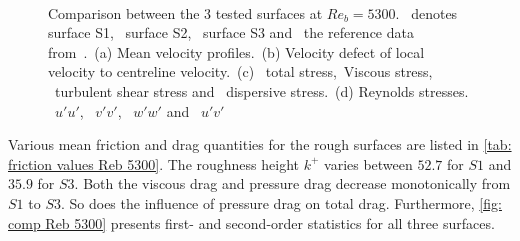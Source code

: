\begin{figure}
    \centering
    \begin{subfigure}[t]{0.495\textwidth}
        \centering
        \subcaption{}
        
        \label{subfig: Reb 5300 velocity profile}
    \end{subfigure}
    \hfill
    \begin{subfigure}[t]{0.495\textwidth}
        \centering
        \subcaption{}
        
        \label{subfig: Reb 5300 velocity defect}        
    \end{subfigure}
    \plotverticalspacing
    \begin{subfigure}[t]{0.495\textwidth}
        \centering
        \subcaption{}
        
        \label{subfig: Reb 5300 total stresses}
    \end{subfigure}
    \hfill
    \begin{subfigure}[t]{0.495\textwidth}
        \centering
        \subcaption{}
        
        \label{subfig: Reb 5300 reynolds stresses}
    \end{subfigure}
    \\[-10pt]
    \caption[Comparison of $S1$, $S2$ and $S3$ at $Re_b = 5300$]{Comparison between the 3 tested surfaces at $Re_b = 5300$. \sOneFiveThreeSymbol \ denotes surface S1, \sTwoFiveThreeSymbol \ surface S2, \sThreeFiveThreeSymbol \ surface S3 and  \ the reference data from~\cite{yaoDirectNumericalSimulations2023}.~(a) Mean velocity profiles.~(b) Velocity defect of local velocity to centreline velocity.~(c) \lsTotalStressSymbol \ total stress,\lsViscousStressSymbol \ Viscous stress, \lsReynoldsStressSymbol \ turbulent shear stress and \lsDispersiveStressSymbol \ dispersive stress.~(d) Reynolds stresses. \lsRuuSymbol \ $u'u'$, \lsRvvSymbol \ $v'v'$, \lsRwwSymbol \ $w'w'$ and \lsRuvSymbol \ $u'v'$}
    \label{fig: comp Reb 5300}
\end{figure}
Various mean friction and drag quantities for the rough surfaces are listed in \autoref{tab: friction values Reb 5300}.
The roughness height $k^+$ varies between $52.7$ for $S1$ and $35.9$ for $S3$.
Both the viscous drag and pressure drag decrease monotonically from $S1$ to $S3$.
So does the influence of pressure drag on total drag. 
Furthermore, \autoref{fig: comp Reb 5300} presents first- and second-order statistics for all three surfaces. 
